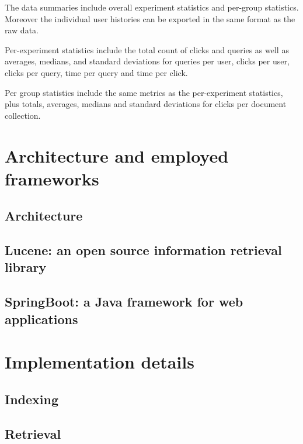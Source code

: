 \documentclass[]{usiinfbachelorproject}
\begin{document}
The data summaries include overall experiment statistics and per-group statistics. Moreover the individual user histories can be 
exported in the same format as the raw data.


Per-experiment statistics include the total count of clicks and queries as well as averages, medians, and standard deviations
for queries per user, clicks per user, clicks per query, time per query and time per click.

Per group statistics include the same metrics as the per-experiment statistics, plus totals, averages, medians and standard deviations
for clicks per document collection.



\section{Architecture and employed frameworks} \label{architecture}




\subsection{Architecture}



\subsection{Lucene: an open source information retrieval library}


\subsection{SpringBoot: a Java framework for web applications}



\section{Implementation details} \label{implementation}

\subsection{Indexing}

\subsection{Retrieval}
\end{document}
